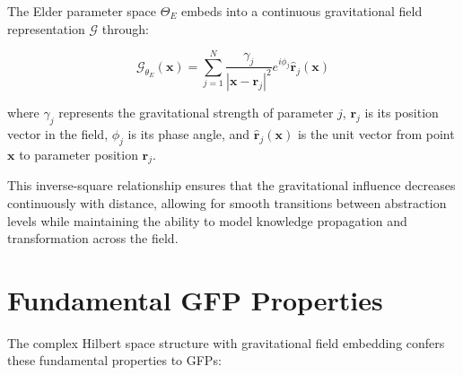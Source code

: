 \begin{theorem}
The Elder parameter space $\Theta_E$ embeds into a continuous gravitational field representation $\mathcal{G}$ through:

\begin{equation}
\mathcal{G}_{\theta_E}(\mathbf{x}) = \sum_{j=1}^N \frac{\gamma_j}{|\mathbf{x} - \mathbf{r}_j|^2} e^{i\phi_j} \hat{\mathbf{r}}_j(\mathbf{x})
\end{equation}

where $\gamma_j$ represents the gravitational strength of parameter $j$, $\mathbf{r}_j$ is its position vector in the field, $\phi_j$ is its phase angle, and $\hat{\mathbf{r}}_j(\mathbf{x})$ is the unit vector from point $\mathbf{x}$ to parameter position $\mathbf{r}_j$.

This inverse-square relationship ensures that the gravitational influence decreases continuously with distance, allowing for smooth transitions between abstraction levels while maintaining the ability to model knowledge propagation and transformation across the field.
\end{theorem}

\section{Fundamental GFP Properties}

The complex Hilbert space structure with gravitational field embedding confers these fundamental properties to GFPs:

